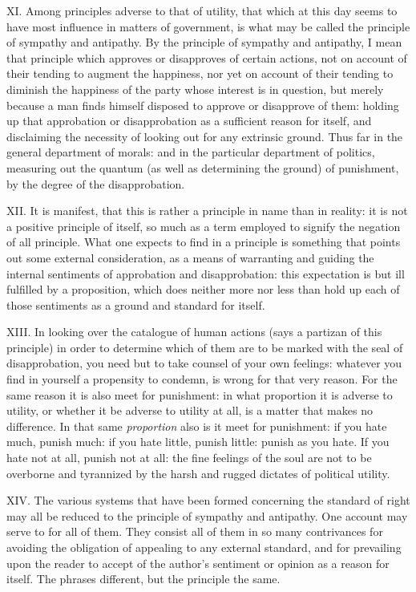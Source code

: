 \documentclass[12pt]{report}
\begin{document}
XI. Among principles adverse to that of utility, that which at this day
seems to have most influence in matters of government, is what may be
called the principle of sympathy and antipathy. By the principle of
sympathy and antipathy, I mean that principle which approves or
disapproves of certain actions, not on account of their tending to
augment the happiness, nor yet on account of their tending to diminish
the happiness of the party whose interest is in question, but merely
because a man finds himself disposed to approve or disapprove of them:
holding up that approbation or disapprobation as a sufficient reason for
itself, and disclaiming the necessity of looking out for any extrinsic
ground. Thus far in the general department of morals: and in the
particular department of politics, measuring out the quantum (as well as
determining the ground) of punishment, by the degree of the
disapprobation.

XII. It is manifest, that this is rather a principle in name than in
reality: it is not a positive principle of itself, so much as a term
employed to signify the negation of all principle. What one expects to
find in a principle is something that points out some external
consideration, as a means of warranting and guiding the internal
sentiments of approbation and disapprobation: this expectation is but
ill fulfilled by a proposition, which does neither more nor less than
hold up each of those sentiments as a ground and standard for itself.

XIII. In looking over the catalogue of human actions (says a partizan of
this principle) in order to determine which of them are to be marked
with the seal of disapprobation, you need but to take counsel of your
own feelings: whatever you find in yourself a propensity to condemn, is
wrong for that very reason. For the same reason it is also meet for
punishment: in what proportion it is adverse to utility, or whether it
be adverse to utility at all, is a matter that makes no difference. In
that same \emph{proportion} also is it meet for punishment: if you hate
much, punish much: if you hate little, punish little: punish as you
hate. If you hate not at all, punish not at all: the fine feelings of
the soul are not to be overborne and tyrannized by the harsh and rugged
dictates of political utility.

XIV. The various systems that have been formed concerning the standard
of right may all be reduced to the principle of sympathy and antipathy.
One account may serve to for all of them. They consist all of them in so
many contrivances for avoiding the obligation of appealing to any
external standard, and for prevailing upon the reader to accept of the
author's sentiment or opinion as a reason for itself. The phrases
different, but the principle the same.
\end{document}
